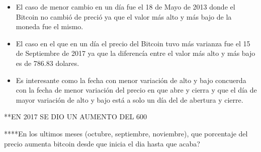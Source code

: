 \documentclass[12pt,letterpaper]{article}
\begin{document}
    \begin{itemize}

        \item El caso de menor cambio en un d\'ia fue el 18 de Mayo de 2013 donde el Bitcoin no cambi\'o de preci\'o ya que el valor m\'as alto y m\'as bajo de la moneda fue el mismo.

        \item El caso en el que en un d\'ia el precio del Bitcoin tuvo m\'as varianza fue el 15 de Septiembre de 2017 ya que la diferenc\'ia entre el valor m\'as alto y m\'as bajo es de 786.83 dolares.

        \item Es interesante como la fecha con menor variaci\'on de alto y bajo concuerda con la fecha de menor variaci\'on del precio en que abre y cierra y que el d\'ia de mayor variaci\'on de alto y bajo est\'a a solo un d\'ia del de abertura y cierre.

    \end{itemize}


    **EN 2017 SE DIO UN AUMENTO DEL 600%

    ****En los ultimos meses (octubre, septiembre, noviembre), que porcentaje del precio aumenta bitcoin desde que inicia el dia hasta que acaba?
    
\end{document}
